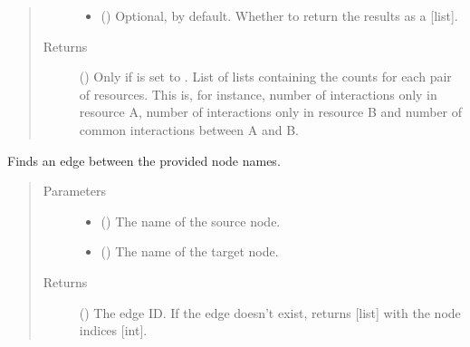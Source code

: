 \documentclass[letterpaper,10pt,english]{sphinxmanual}
\begin{document}
\begin{fulllineitems}
\begin{fulllineitems}
\begin{quote}
\begin{description}
\begin{itemize}
\item {} 
 () \textendash{} Optional,  by default. Whether to return the
results as a {[}list{]}.

\end{itemize}

\item[{Returns}] \leavevmode
() \textendash{} Only if  is set to . List
of lists containing the counts for each pair of resources.
This is, for instance, number of interactions only in
resource A, number of interactions only in resource B and
number of common interactions between A and B.

\end{description}\end{quote}

\end{fulllineitems}


\begin{fulllineitems}
\label{\detokenize{main:pypath.main.PyPath.straight_between}}
Finds an edge between the provided node names.
\begin{quote}\begin{description}
\item[{Parameters}] \leavevmode\begin{itemize}
\item {} 
 () \textendash{} The name of the source node.

\item {} 
 () \textendash{} The name of the target node.

\end{itemize}

\item[{Returns}] \leavevmode
() \textendash{} The edge ID. If the edge doesn’t exist, returns
{[}list{]} with the node indices {[}int{]}.

\end{description}\end{quote}


\end{fulllineitems}
\end{fulllineitems}
\end{document}
